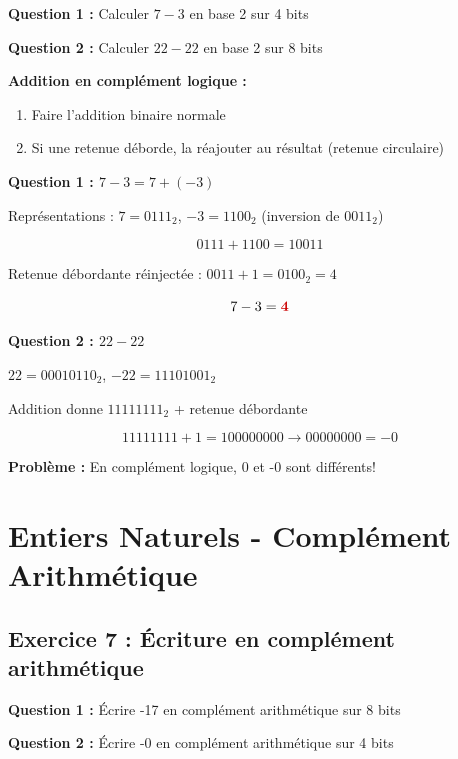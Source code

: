 \documentclass[12pt,a4paper]{article}
\begin{document}
\begin{exercice}
\textbf{Question 1 :} Calculer $7 - 3$ en base 2 sur 4 bits

\textbf{Question 2 :} Calculer $22 - 22$ en base 2 sur 8 bits
\end{exercice}

\begin{methode}
\textbf{Addition en complément logique :}
\begin{enumerate}
    \item Faire l'addition binaire normale
    \item Si une retenue déborde, la réajouter au résultat (retenue circulaire)
\end{enumerate}
\end{methode}

\begin{solution}
\textbf{Question 1 : $7 - 3 = 7 + (-3)$}

Représentations : $7 = 0111_2$, $-3 = 1100_2$ (inversion de $0011_2$)

$$0111 + 1100 = 10011$$

Retenue débordante réinjectée : $0011 + 1 = 0100_2 = 4$

$$7 - 3 = \textcolor{importantrouge}{\textbf{4}}$$
\end{solution}

\begin{solution}
\textbf{Question 2 : $22 - 22$}

$22 = 00010110_2$, $-22 = 11101001_2$

Addition donne $11111111_2$ + retenue débordante

$$11111111 + 1 = 100000000 \rightarrow 00000000 = -0$$

\textbf{Problème :} En complément logique, 0 et -0 sont différents!
\end{solution}

\newpage
\section{Entiers Naturels - Complément Arithmétique}

\subsection{Exercice 7 : Écriture en complément arithmétique}

\begin{exercice}
\textbf{Question 1 :} Écrire -17 en complément arithmétique sur 8 bits

\textbf{Question 2 :} Écrire -0 en complément arithmétique sur 4 bits
\end{exercice}
\end{document}
